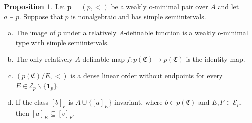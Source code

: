 \documentclass{amsart}
\theoremstyle{definition}
\newtheorem{Proposition}[Theorem]{Proposition}
\theoremstyle{definition}
\newcommand{\Mon}{\mathfrak C}
\begin{document}
\begin{Proposition}\label{Prop_ssi_consequences}
Let $\mathbf p=(p,<)$ be a weakly o-minimal pair over $A$ and let $a\models p$. Suppose that $p$ is nonalgebraic and has simple semiintervals.   
\begin{enumerate}[(a)]
\item The image of $p$ under a relatively $A$-definable function is a weakly o-minimal type with simple semiintervals.
\item The only relatively $A$-definable map $f:p(\Mon)\to p(\Mon)$ is the identity map. 
\item $(p(\Mon)/E,<)$ is a dense linear order without endpoints for every $E\in\mathcal E_p\smallsetminus \{\mathbf 1_p\}$. 
\item If the class $[b]_F$ is $A\cup\{[a]_E\}$-invariant, where $b\in p(\Mon)$ and $E,F\in \mathcal E_p$, then $[a]_E\subseteq [b]_F$.
\end{enumerate}
\end{Proposition}
\end{document}
